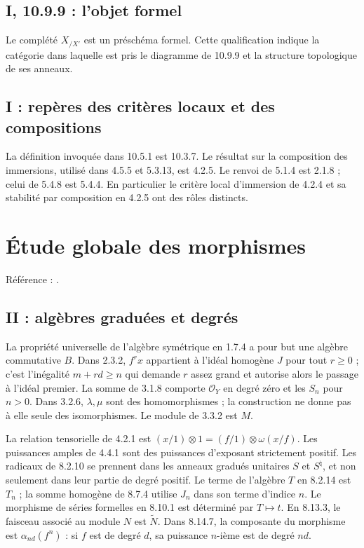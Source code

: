 \documentclass[11pt,a4paper]{article}
\begin{document}
\subsection{I, 10.9.9 : l’objet formel}
\label{note:base1-formalname}
Le complété $X_{/X'}$ est un préschéma formel.
Cette qualification indique la catégorie dans laquelle est pris
le diagramme de 10.9.9 et la structure topologique de ses anneaux.

\subsection{I : repères des critères locaux et des compositions}
\label{note:base1-refs}
La définition invoquée dans 10.5.1 est 10.3.7.
Le résultat sur la composition des immersions, utilisé dans 4.5.5
et 5.3.13, est 4.2.5. Le renvoi de 5.1.4 est 2.1.8 ; celui de
5.4.8 est 5.4.4. En particulier le critère local d'immersion
de 4.2.4 et sa stabilité par composition en 4.2.5 ont des rôles distincts.
\par

\section{Étude globale des morphismes}
\label{part:base2}
Référence : \cite{EGAII}.
\subsection{II : algèbres graduées et degrés}
\label{note:base2-graded}
La propriété universelle de l'algèbre symétrique en 1.7.4 a pour
but une algèbre commutative $B$. Dans 2.3.2, $f^rx$ appartient
à l'idéal homogène $J$ pour tout $r\geq0$ ; c'est l'inégalité
$m+rd\geq n$ qui demande $r$ assez grand et autorise alors
le passage à l'idéal premier. La somme de 3.1.8 comporte
$\mathcal O_Y$ en degré zéro et les $S_n$ pour $n>0$.
Dans 3.2.6, $\lambda,\mu$ sont des homomorphismes ; la construction
ne donne pas à elle seule des isomorphismes. Le module de 3.3.2
est $M$.

La relation tensorielle de 4.2.1 est
$(x/1)\otimes1=(f/1)\otimes\omega(x/f)$.
Les puissances amples de 4.4.1 sont des puissances d'exposant
strictement positif. Les radicaux de 8.2.10 se prennent dans
les anneaux gradués unitaires $S$ et $S^\natural$,
et non seulement dans leur partie de degré positif.
Le terme de l'algèbre $T$ en 8.2.14 est $T_n$ ; la somme homogène
de 8.7.4 utilise $J_n$ dans son terme d'indice $n$.
Le morphisme de séries formelles en 8.10.1 est déterminé par
$T\mapsto t$.
En 8.13.3, le faisceau associé au module $N$ est $\widetilde N$.
Dans 8.14.7, la composante du morphisme est
$\alpha_{nd}(f^n)$ : si $f$ est de degré $d$, sa puissance
$n$-ième est de degré $nd$.
\end{document}
